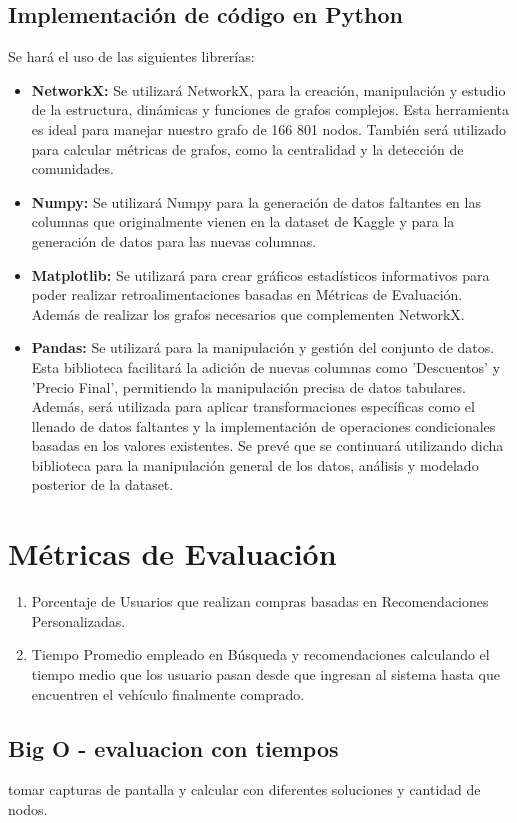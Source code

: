 \documentclass[12pt]{article}
\begin{document}
\subsection{Implementación de código en Python}
Se hará el uso de las siguientes librerías:
\begin{itemize}
    \item \textbf{NetworkX:} Se utilizará NetworkX, para la creación, manipulación y estudio de la estructura, dinámicas y funciones de grafos complejos. Esta herramienta es ideal para manejar nuestro grafo de 166 801 nodos. También será utilizado para calcular métricas de grafos, como la centralidad y la detección de comunidades.
    \item \textbf{Numpy:} Se utilizará Numpy para la generación de datos faltantes en las columnas que originalmente vienen en la dataset de Kaggle y para la generación de datos para las nuevas columnas.
    \item \textbf{Matplotlib:} Se utilizará para crear gráficos estadísticos informativos para poder realizar retroalimentaciones basadas en Métricas de Evaluación. Además de realizar los grafos necesarios que complementen NetworkX.
    \item \textbf{Pandas:} Se utilizará para la manipulación y gestión del conjunto de datos. Esta biblioteca facilitará la adición de nuevas columnas como 'Descuentos' y 'Precio Final', permitiendo la manipulación precisa de datos tabulares. Además, será utilizada para aplicar transformaciones específicas como el llenado de datos faltantes y la implementación de operaciones condicionales basadas en los valores existentes. Se prevé que se continuará utilizando dicha biblioteca para la manipulación general de los datos, análisis y modelado posterior de la dataset.
\end{itemize}

\section{Métricas de Evaluación}
\begin{enumerate}
    \item Porcentaje de Usuarios que realizan compras basadas en Recomendaciones Personalizadas.
    \item Tiempo Promedio empleado en Búsqueda y recomendaciones calculando el tiempo medio que los usuario pasan desde que ingresan al sistema hasta que encuentren el vehículo finalmente comprado.
\end{enumerate}
\subsection{Big O - evaluacion con tiempos}
tomar capturas de pantalla y calcular con diferentes soluciones y cantidad de nodos.
\end{document}
